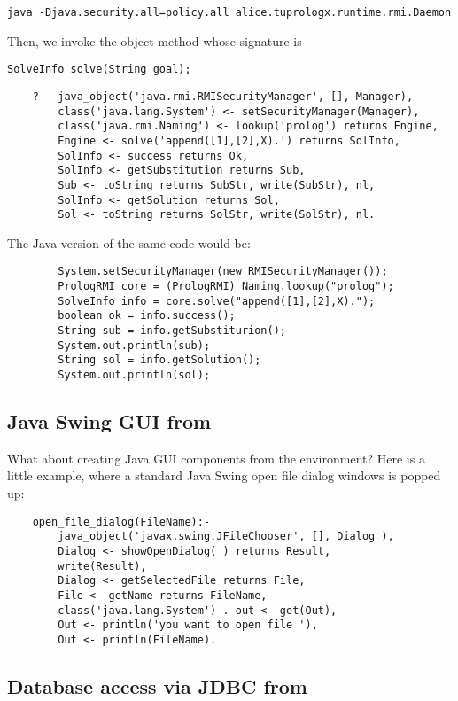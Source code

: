 {\small%
\texttt{java -Djava.security.all=policy.all  alice.tuprologx.runtime.rmi.Daemon}
}

\noindent Then, we invoke the object method whose signature is

{\small%
\texttt{SolveInfo solve(String goal);}
}
%
{\small%
\begin{verbatim}
    ?-  java_object('java.rmi.RMISecurityManager', [], Manager),
        class('java.lang.System') <- setSecurityManager(Manager),
        class('java.rmi.Naming') <- lookup('prolog') returns Engine,
        Engine <- solve('append([1],[2],X).') returns SolInfo,
        SolInfo <- success returns Ok,
        SolInfo <- getSubstitution returns Sub,
        Sub <- toString returns SubStr, write(SubStr), nl,
        SolInfo <- getSolution returns Sol,
        Sol <- toString returns SolStr, write(SolStr), nl.
\end{verbatim}
}
%
\noindent The Java version of the same code would be:
%
{\small%
\begin{verbatim}
        System.setSecurityManager(new RMISecurityManager());
        PrologRMI core = (PrologRMI) Naming.lookup("prolog");
        SolveInfo info = core.solve("append([1],[2],X).");
        boolean ok = info.success();
        String sub = info.getSubstiturion();
        System.out.println(sub);
        String sol = info.getSolution();
        System.out.println(sol);
\end{verbatim}
}


\subsection{Java Swing GUI from \tuprolog}

What about creating Java GUI components from the \tuprolog{}
environment?
%
Here is a little example, where a standard Java Swing open file
dialog windows is popped up:
%
{\small%
\begin{verbatim}
    open_file_dialog(FileName):-
        java_object('javax.swing.JFileChooser', [], Dialog ),
        Dialog <- showOpenDialog(_) returns Result,
        write(Result),
        Dialog <- getSelectedFile returns File,
        File <- getName returns FileName,
        class('java.lang.System') . out <- get(Out),
        Out <- println('you want to open file '),
        Out <- println(FileName).
\end{verbatim}
}

\subsection{Database access via JDBC from \tuprolog}

